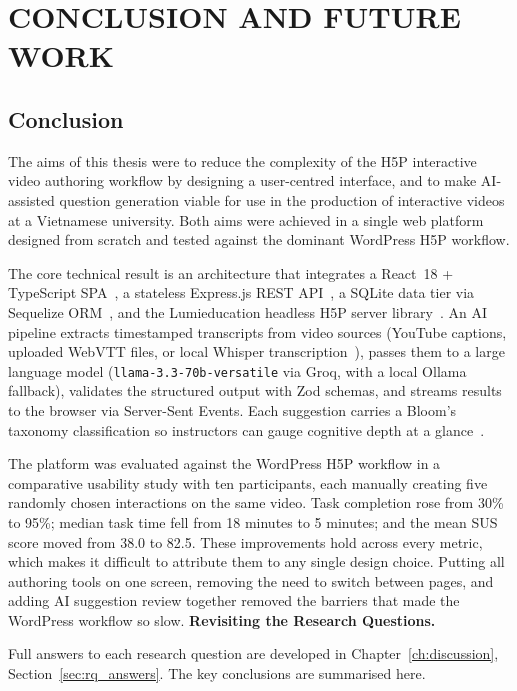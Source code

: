 \chapter{CONCLUSION AND FUTURE WORK}

\section{Conclusion}

The aims of this thesis were to reduce the complexity of the H5P interactive video authoring workflow by designing a user-centred interface, and to make AI-assisted question generation viable for use in the production of interactive videos at a Vietnamese university. Both aims were achieved in a single web platform designed from scratch and tested against the dominant WordPress H5P workflow.

The core technical result is an architecture that integrates a React~18 + TypeScript SPA~\cite{react2023,typescript2023}, a stateless Express.js REST API~\cite{expressjs2023}, a SQLite data tier via Sequelize ORM~\cite{sqlite2023,sequelize2023}, and the Lumieducation headless H5P server library~\cite{lumieducation2023}. An AI pipeline extracts timestamped transcripts from video sources (YouTube captions, uploaded WebVTT files, or local Whisper transcription~\cite{radford2023}), passes them to a large language model (\texttt{llama-3.3-70b-versatile} via Groq, with a local Ollama fallback), validates the structured output with Zod schemas, and streams results to the browser via Server-Sent Events. Each suggestion carries a Bloom's taxonomy classification so instructors can gauge cognitive depth at a glance~\cite{anderson2001}.

The platform was evaluated against the WordPress H5P workflow in a comparative usability study with ten participants, each manually creating five randomly chosen interactions on the same video. Task completion rose from 30\% to 95\%; median task time fell from 18 minutes to 5 minutes; and the mean SUS score moved from 38.0 to 82.5. These improvements hold across every metric, which makes it difficult to attribute them to any single design choice. Putting all authoring tools on one screen, removing the need to switch between pages, and adding AI suggestion review together removed the barriers that made the WordPress workflow so slow.
\clearpage
\textbf{Revisiting the Research Questions.}

Full answers to each research question are developed in Chapter~\ref{ch:discussion}, Section~\ref{sec:rq_answers}. The key conclusions are summarised here.

